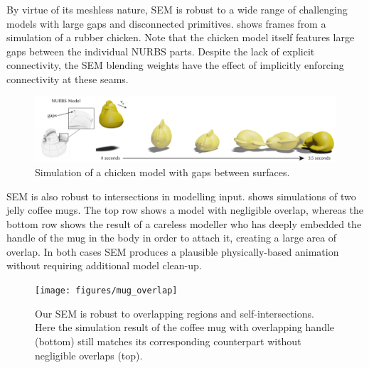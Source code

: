 By virtue of its meshless nature, SEM is robust to a wide range of challenging models with large gaps and disconnected primitives.
 shows frames from a simulation of a rubber chicken. Note that the chicken model itself features large gaps between the individual NURBS parts. 
Despite the lack of explicit connectivity, the SEM blending weights have the effect of implicitly enforcing connectivity at these seams. 

\begin{figure}[htp]
  \includegraphics[width=\textwidth]{figures/chicken.pdf}
  \caption{Simulation of a chicken model with gaps between surfaces.}
  \label{fig:chicken}
\end{figure}

SEM is also robust to intersections in modelling input.  shows simulations of two jelly coffee mugs. 
The top row shows a model with negligible overlap, whereas the bottom row shows the result of a careless modeller who has deeply embedded the handle of the mug in the body in order to attach it, creating a large area of overlap.
In both cases SEM produces a plausible physically-based animation without requiring additional model clean-up.

\begin{figure}[h]
  \texttt{[image: figures/mug\_overlap]}
  \caption{Our SEM is robust to overlapping regions and self-intersections. Here the simulation result of the coffee mug with overlapping handle (bottom) still matches its corresponding counterpart without negligible overlaps (top). }
  \label{fig:badmodels}
\end{figure}


